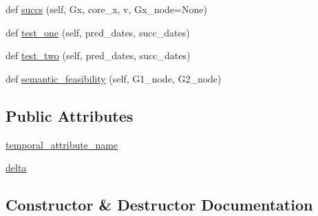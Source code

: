 \begin{DoxyCompactItemize}
\item 
def \hyperlink{classnetworkx_1_1algorithms_1_1isomorphism_1_1temporalisomorphvf2_1_1TimeRespectingDiGraphMatcher_a0d247916acdcf75789b59cb806bcd275}{succs} (self, Gx, core\+\_\+x, v, Gx\+\_\+node=None)
\item 
def \hyperlink{classnetworkx_1_1algorithms_1_1isomorphism_1_1temporalisomorphvf2_1_1TimeRespectingDiGraphMatcher_a007e6c76a0b0578cff0b7451b1b366e1}{test\+\_\+one} (self, pred\+\_\+dates, succ\+\_\+dates)
\item 
def \hyperlink{classnetworkx_1_1algorithms_1_1isomorphism_1_1temporalisomorphvf2_1_1TimeRespectingDiGraphMatcher_a2e50c62dc4d22f0c19a49cde761abf6d}{test\+\_\+two} (self, pred\+\_\+dates, succ\+\_\+dates)
\item 
def \hyperlink{classnetworkx_1_1algorithms_1_1isomorphism_1_1temporalisomorphvf2_1_1TimeRespectingDiGraphMatcher_a67b6b39439232e0a50fe0cc7744703ac}{semantic\+\_\+feasibility} (self, G1\+\_\+node, G2\+\_\+node)
\end{DoxyCompactItemize}
\subsection*{Public Attributes}
\begin{DoxyCompactItemize}
\item 
\hyperlink{classnetworkx_1_1algorithms_1_1isomorphism_1_1temporalisomorphvf2_1_1TimeRespectingDiGraphMatcher_a6a642a5aaf9f56822b08dbd93a6dee12}{temporal\+\_\+attribute\+\_\+name}
\item 
\hyperlink{classnetworkx_1_1algorithms_1_1isomorphism_1_1temporalisomorphvf2_1_1TimeRespectingDiGraphMatcher_a3777ca1202b9fc1f8f3bacbc82b4b58a}{delta}
\end{DoxyCompactItemize}


\subsection{Constructor \& Destructor Documentation}
\mbox{\label{classnetworkx_1_1algorithms_1_1isomorphism_1_1temporalisomorphvf2_1_1TimeRespectingDiGraphMatcher_a8a284eff7c2ec2f7505b4630de9b5c5c}} 
